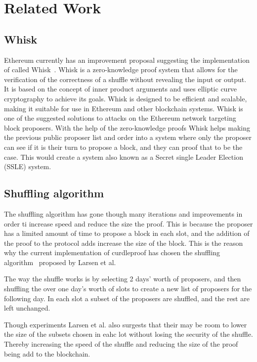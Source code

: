 \section{Related Work}\label{sec:related-work}




\subsection{Whisk}\label{sec:related-work-whisk}
Ethereum currently has an improvement proposal suggesting the implementation of called Whisk~\cite{Whisk2024}.
Whisk is a zero-knowledge proof system that allows for the verification of the correctness of a shuffle without revealing the input or output.
It is based on the concept of inner product arguments and uses elliptic curve cryptography to achieve its goals.
Whisk is designed to be efficient and scalable, making it suitable for use in Ethereum and other blockchain systems.
Whisk is one of the suggested solutions to attacks on the Ethereum network targeting block proposers.
With the help of the zero-knowledge proofs Whisk helps making the previous public proposer list and order into a system where only the proposer can see if it is their turn to propose a block, and they can proof that to be the case.
This would create a system also known as a Secret single Leader Election (SSLE) system.


\subsection{Shuffling algorithm}\label{sec:related-work-Shuffling-algorithm}
The shuffling algorithm has gone though many iterations and improvements in order ti increase speed and reduce the size the proof.
This is because the proposer has a limited amount of time to propose a block in each slot, and the addition of the proof to the protocol adds increase the size of the block.
This is the reason why the current implementation of curdleproof has chosen the shuffling algorithm~\cite{cryptoeprint:2022/560} proposed by Larsen et al.

The way the shuffle works is by selecting 2 days' worth of proposers, and then shuffling the over one day's worth of slots to create a new list of proposers for the following day.
In each slot a subset of the proposers are shuffled, and the rest are left unchanged.

Though experiments Larsen et al. also surgests that their may be room to lower the size of the subsets chosen in eahc lot without losing the security of the shuffle.
Thereby increasing the speed of the shuffle and reducing the size of the proof being add to the blockchain.

